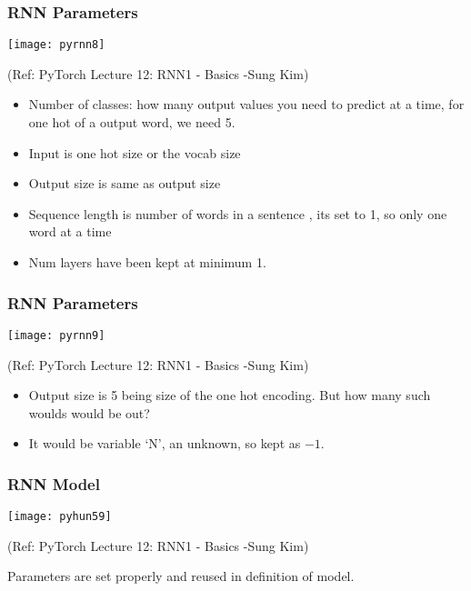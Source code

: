 \begin{frame}[fragile] \frametitle{RNN Parameters}

\begin{center}
\texttt{[image: pyrnn8]}

\tiny{(Ref: PyTorch Lecture 12: RNN1 - Basics -Sung Kim)}
\end{center}

\begin{itemize}
\item Number of classes: how many output values you need to predict at a time, for one hot of a output word, we need 5.
\item Input is one hot size or the vocab size
\item Output size is same as output size
\item Sequence length is number of words in a sentence , its set to 1, so only one word at a time
\item Num layers have been kept at minimum 1.
\end{itemize}
\end{frame}


\begin{frame}[fragile] \frametitle{RNN Parameters}

\begin{center}
\texttt{[image: pyrnn9]}

\tiny{(Ref: PyTorch Lecture 12: RNN1 - Basics -Sung Kim)}
\end{center}

\begin{itemize}
\item Output size is 5 being size of the one hot encoding. But how many such woulds would be out?
\item It would be variable `N', an unknown, so kept as $-1$.
\end{itemize}
\end{frame}



\begin{frame}[fragile] \frametitle{RNN Model}

\begin{center}
\texttt{[image: pyhun59]}

\tiny{(Ref: PyTorch Lecture 12: RNN1 - Basics -Sung Kim)}
\end{center}

Parameters are set properly and reused in definition of model.
\end{frame}



